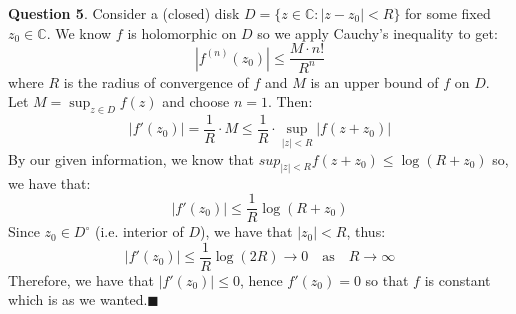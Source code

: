\documentclass{article}
\begin{document}
    \textbf{Question 5}.
    Consider a (closed) disk $D = \{z\in\mathbb{C}: |z-z_0|<R\}$ for some fixed $z_0\in\mathbb{C}$. We know $f$ is holomorphic on $D$ so we apply
    Cauchy's inequality to get:
    \[ |f^{(n)}(z_0)| \leq \frac{M\cdot n!}{R^n} \]
    where $R$ is the radius of convergence of $f$ and $M$ is an upper bound of $f$ on $D$. Let $M = \sup_{z\in D}f(z)$ and choose $n=1$. Then:
    \[ |f'(z_0)| = \frac{1}{R}\cdot M \leq \frac{1}{R}\cdot \sup_{|z|<R}|f(z+z_0)|\]
    By our given information, we know that $sup_{|z|<R}f(z+z_0)\leq \log{(R+z_0)}$ so, we have that:
    \[ |f'(z_0)| \leq \frac{1}{R}\log{(R+z_0)} \]
    Since $z_0\in D^{\circ}$ (i.e. interior of $D$), we have that $|z_0|<R$, thus:
    \[ |f'(z_0)| \leq \frac{1}{R}\log(2R) \to 0 \quad\text{as}\quad R\to\infty \]
    Therefore, we have that $|f'(z_0)|\leq 0$, hence $f'(z_0) = 0$ so that $f$ is constant which is as we wanted.\hfill$\blacksquare$
    
    
\end{document}

